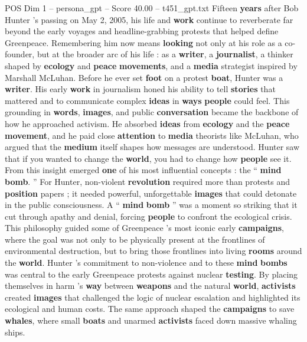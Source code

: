 \begin{textsample}{POS Dim 1 – persona\_gpt – Score 40.00 – t451\_gpt.txt}  \label{ex:f1_pos_029}
Fifteen \textbf{years} after Bob Hunter ’s passing on May 2, 2005, his life and \textbf{work} continue to reverberate far beyond the early voyages and headline-grabbing protests that helped define Greenpeace.
Remembering him now means \textbf{looking} not only at his role as a co-founder, but at the broader arc of his life : as a \textbf{writer}, a \textbf{journalist}, a thinker shaped by \textbf{ecology} and \textbf{peace} \textbf{movements}, and a \textbf{media} strategist inspired by Marshall McLuhan.
Before he ever set \textbf{foot} on a protest \textbf{boat}, Hunter was a \textbf{writer}.
His early \textbf{work} in journalism honed his ability to tell \textbf{stories} that mattered and to communicate complex \textbf{ideas} in \textbf{ways} \textbf{people} could feel.
This grounding in \textbf{words}, \textbf{images}, and public \textbf{conversation} became the backbone of how he approached activism.
He absorbed \textbf{ideas} from \textbf{ecology} and the \textbf{peace} \textbf{movement}, and he paid close \textbf{attention} to \textbf{media} theorists like McLuhan, who argued that the \textbf{medium} itself shapes how messages are understood.
Hunter saw that if you wanted to change the \textbf{world}, you had to change how \textbf{people} see it.
From this insight emerged \textbf{one} of his most influential concepts : the “ \textbf{mind} \textbf{bomb}. ” For Hunter, non-violent \textbf{revolution} required more than protests and \textbf{position} papers ; it needed powerful, unforgettable \textbf{images} that could detonate in the public consciousness.
A “ \textbf{mind} \textbf{bomb} ” was a moment so striking that it cut through apathy and denial, forcing \textbf{people} to confront the ecological crisis.
This philosophy guided some of Greenpeace ’s most iconic early \textbf{campaigns}, where the goal was not only to be physically present at the frontlines of environmental destruction, but to bring those frontlines into living \textbf{rooms} around the \textbf{world}.
Hunter ’s commitment to non-violence and to these \textbf{mind} \textbf{bombs} was central to the early Greenpeace protests against nuclear \textbf{testing}.
By placing themselves in harm ’s \textbf{way} between \textbf{weapons} and the natural \textbf{world}, \textbf{activists} created \textbf{images} that challenged the logic of nuclear escalation and highlighted its ecological and human costs.
The same approach shaped the \textbf{campaigns} to save \textbf{whales}, where small \textbf{boats} and unarmed \textbf{activists} faced down massive whaling ships.

\end{textsample}
